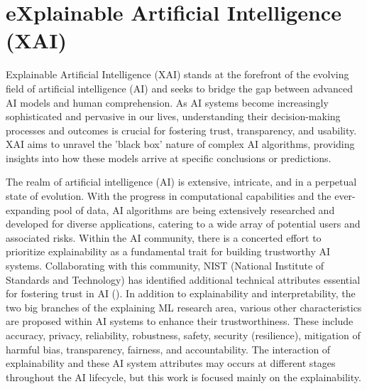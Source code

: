 \documentclass[binding=0.6cm]{sapthesis}
\newcommand{\mycite}[1]{(\cite{#1})}
\begin{document}


\newpage
\section{eXplainable Artificial Intelligence (XAI)}
\label{sec:bg.xai}
Explainable Artificial Intelligence (XAI) stands at the forefront of the evolving field of artificial intelligence (AI) and seeks to bridge the gap between advanced AI models and human comprehension. As AI systems become increasingly sophisticated and pervasive in our lives, understanding their decision-making processes and outcomes is crucial for fostering trust, transparency, and usability. XAI aims to unravel the 'black box' nature of complex AI algorithms, providing insights into how these models arrive at specific conclusions or predictions.


The realm of artificial intelligence (AI) is extensive, intricate, and in a perpetual state of evolution. With the progress in computational capabilities and the ever-expanding pool of data, AI algorithms are being extensively researched and developed for diverse applications, catering to a wide array of potential users and associated risks. Within the AI community, there is a concerted effort to prioritize explainability as a fundamental trait for building trustworthy AI systems. Collaborating with this community, NIST (National Institute of Standards and Technology) has identified additional technical attributes essential for fostering trust in AI \mycite{phillips2021-nist-xai}. In addition to explainability and interpretability, the two big branches of the explaining ML research area, various other characteristics are proposed within AI systems to enhance their trustworthiness. These include accuracy, privacy, reliability, robustness, safety, security (resilience), mitigation of harmful bias, transparency, fairness, and accountability. The interaction of explainability and these AI system attributes may occurs at different stages throughout the AI lifecycle, but this work is focused mainly on the explainability.
\end{document}
